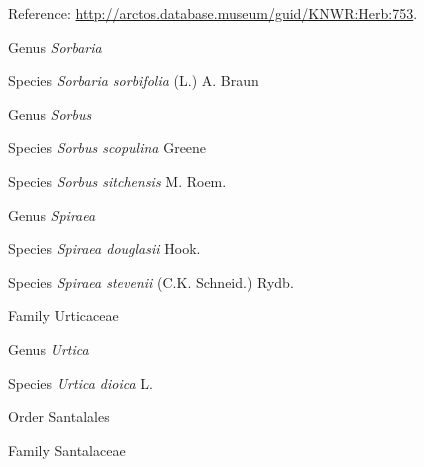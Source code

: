 \documentclass[9pt, article]{memoir}
\begin{document}
\begin{multicols}{2}
\vspace{6pt}Reference: 
\url{http://arctos.database.museum/guid/KNWR:Herb:753}.

\vspace{6pt}\noindent\hspace{30pt}Genus \textit{Sorbaria}


\vspace{6pt}\noindent\hspace{36pt}Species \textit{Sorbaria sorbifolia} (L.) A. Braun


\vspace{6pt}\noindent\hspace{30pt}Genus \textit{Sorbus}


\vspace{6pt}\noindent\hspace{36pt}Species \textit{Sorbus scopulina} Greene


\vspace{6pt}\noindent\hspace{36pt}Species \textit{Sorbus sitchensis} M. Roem.


\vspace{6pt}\noindent\hspace{30pt}Genus \textit{Spiraea}


\vspace{6pt}\noindent\hspace{36pt}Species \textit{Spiraea douglasii} Hook.


\vspace{6pt}\noindent\hspace{36pt}Species \textit{Spiraea stevenii} (C.K. Schneid.) Rydb.


\vspace{6pt}\noindent\hspace{24pt}Family Urticaceae


\vspace{6pt}\noindent\hspace{30pt}Genus \textit{Urtica}


\vspace{6pt}\noindent\hspace{36pt}Species \textit{Urtica dioica} L.


\vspace{6pt}\noindent\hspace{18pt}Order Santalales


\vspace{6pt}\noindent\hspace{24pt}Family Santalaceae



\end{multicols}
\end{document}

